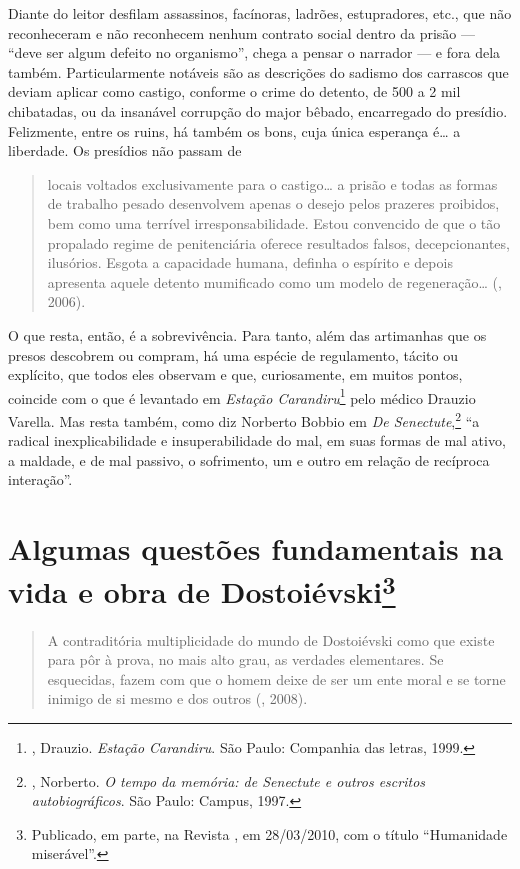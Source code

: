 Diante do leitor desfilam assassinos, facínoras, ladrões,
estupradores, etc., que não reconheceram e não reconhecem
nenhum contrato social dentro da prisão --- ``deve ser algum
defeito no organismo'', chega a pensar o narrador --- e fora
dela também. Particularmente notáveis são as descrições do
sadismo dos carrascos que deviam aplicar como castigo,
conforme o crime do detento, de 500 a 2 mil chibatadas, ou da
insanável corrupção do major bêbado, encarregado do presídio. Felizmente,
entre os ruins, há também os bons, cuja única esperança é\ldots{} a liberdade. Os presídios não passam de

\begin{quotation}
locais voltados exclusivamente para o castigo\ldots{} a prisão e todas as formas de trabalho pesado desenvolvem apenas o desejo pelos prazeres proibidos, bem como uma terrível irresponsabilidade. Estou convencido de que o tão propalado regime de penitenciária oferece resultados falsos, decepcionantes, ilusórios. Esgota a capacidade humana, definha o espírito e depois apresenta aquele detento mumificado como um modelo de regeneração\ldots{} (, 2006).
\end{quotation}

O que resta, então, é a sobrevivência. Para tanto, além das
artimanhas que os presos descobrem ou compram, há uma espécie
de regulamento, tácito ou explícito, que todos eles observam e
que, curiosamente, em muitos pontos, coincide com o que é
levantado em \emph{Estação Carandiru}\footnote{, Drauzio.
\emph{Estação Carandiru}. São Paulo: Companhia das letras, 1999.} pelo
médico Drauzio Varella. Mas resta também, como diz Norberto Bobbio em
\emph{De Senectute},\footnote{, Norberto.
\emph{O tempo da memória: de Senectute e outros escritos
autobiográficos}. São Paulo: Campus, 1997.} ``a radical
inexplicabilidade e insuperabilidade do mal, em suas formas
de mal ativo, a maldade, e de mal passivo, o sofrimento, um
e outro em relação de recíproca interação''.

\chapter{Algumas questões fundamentais na vida e obra de Dostoiévski\footnote{Publicado, em parte, na Revista {}, em 28/03/2010, com o título ``Humanidade miserável''.}}

\begin{quotation}
A contraditória multiplicidade do mundo de Dostoiévski como
que existe para pôr à prova, no mais alto grau, as verdades
elementares. Se esquecidas, fazem com que o homem deixe de
ser um ente moral e se torne inimigo de si mesmo e dos
outros (, 2008).
\end{quotation}


